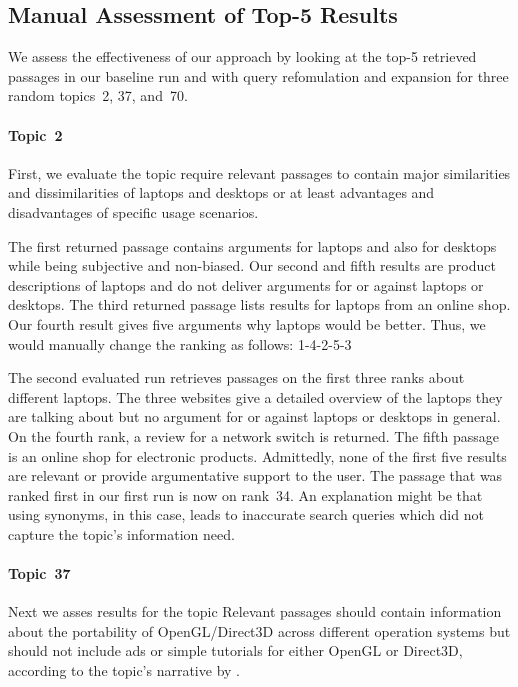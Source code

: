 \subsection{Manual Assessment of Top-5 Results}

We assess the effectiveness of our approach by looking at the top-5 retrieved passages in our baseline run and with query refomulation and expansion for three random topics~2, 37, and~70.

\paragraph{Topic~2}

First, we evaluate the topic 
\citet{BondarenkoFKSGBPBSWPH2022} require relevant passages to contain major similarities and dissimilarities of laptops and desktops or at least advantages and disadvantages of specific usage scenarios.

The first returned passage contains arguments for laptops and also for desktops while being subjective and non-biased.
Our second and fifth results are product descriptions of laptops and do not deliver arguments for or against laptops or desktops.
The third returned passage lists results for laptops from an online shop.
Our fourth result gives five arguments why laptops would be better.
Thus, we would manually change the ranking as follows: 1-4-2-5-3

The second evaluated run retrieves passages on the first three ranks about different laptops.
The three websites give a detailed overview of the laptops they are talking about but no argument for or against laptops or desktops in general.
On the fourth rank, a review for a network switch is returned.
The fifth passage is an online shop for electronic products.
Admittedly, none of the first five results are relevant or provide argumentative support to the user.
The passage that was ranked first in our first run is now on rank~34.
An explanation might be that using synonyms, in this case, leads to inaccurate search queries which did not capture the topic's information need.

\paragraph{Topic~37}

Next we asses results for the topic
Relevant passages should contain information about the portability of OpenGL/Direct3D across different operation systems but should not include ads or simple tutorials for either OpenGL or Direct3D, according to the topic's narrative by \citet{BondarenkoFKSGBPBSWPH2022}.

